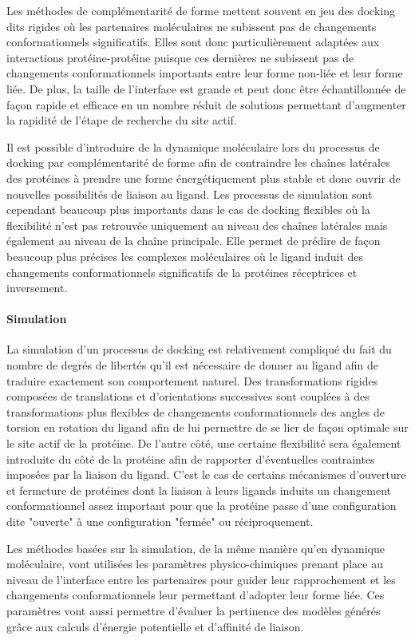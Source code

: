 Les méthodes de complémentarité de forme mettent souvent en jeu des docking dits rigides où les partenaires moléculaires ne subissent pas de changements conformationnels significatifs. Elles sont donc particulièrement adaptées aux interactions protéine-protéine puisque ces dernières ne subissent pas de changements conformationnels importants entre leur forme non-liée et leur forme liée. De plus, la taille de l'interface est grande et peut donc être échantillonnée de façon rapide et efficace en un nombre réduit de solutions permettant d'augmenter la rapidité de l'étape de recherche du site actif. 

Il est possible d'introduire de la dynamique moléculaire lors du processus de docking par complémentarité de forme afin de contraindre les chaînes latérales des protéines à prendre une forme énergétiquement plus stable et donc ouvrir de nouvelles possibilités de liaison au ligand.
Les processus de simulation sont cependant beaucoup plus importants dans le cas de docking flexibles où la flexibilité n'est pas retrouvée uniquement au niveau des chaînes latérales mais également au niveau de la chaîne principale. Elle permet de prédire de façon beaucoup plus précises les complexes moléculaires où le ligand induit des changements conformationnels significatifs de la protéines réceptrices et inversement.

\paragraph{Simulation}

La simulation d'un processus de docking est relativement compliqué du fait du nombre de degrés de libertés qu'il est nécessaire de donner au ligand afin de traduire exactement son comportement naturel. Des transformations rigides composées de translations et d'orientations successives sont couplées à des transformations plus flexibles de changements conformationnels des angles de torsion en rotation du ligand afin de lui permettre de se lier de façon optimale sur le site actif de la protéine. De l'autre côté, une certaine flexibilité sera également introduite du côté de la protéine afin de rapporter d'éventuelles contraintes imposées par la liaison du ligand. C'est le cas de certains mécanismes d'ouverture et fermeture de protéines dont la liaison à leurs ligands induits un changement conformationnel assez important pour que la protéine passe d'une configuration dite "ouverte" à une configuration "fermée" ou réciproquement.

Les méthodes basées sur la simulation, de la même manière qu'en dynamique moléculaire, vont utilisées les paramètres physico-chimiques prenant place au niveau de l'interface entre les partenaires pour guider leur rapprochement et les changements conformationnels leur permettant d'adopter leur forme liée. Ces paramètres vont aussi permettre d'évaluer la pertinence des modèles générés grâce aux calculs d'énergie potentielle et d'affinité de liaison. 

